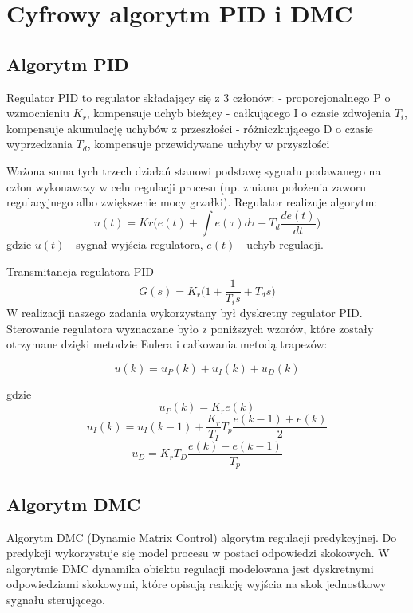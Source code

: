 \section{Cyfrowy algorytm PID i DMC}

\subsection{Algorytm PID}

Regulator PID to regulator składający się z 3 członów:\newline
\indent- proporcjonalnego P o wzmocnieniu $K_{r}$, kompensuje uchyb
bieżący\newline
\indent- całkującego I o czasie zdwojenia $T_{i}$, kompensuje akumulację
uchybów z przeszłości\newline
\indent- różniczkującego D o czasie wyprzedzania $T_{d}$, kompensuje
przewidywane uchyby w przyszłości\newline

Ważona suma tych trzech działań stanowi podstawę sygnału
podawanego na człon wykonawczy w celu regulacji procesu (np.
zmiana położenia zaworu regulacyjnego albo zwiększenie mocy
grzałki).
Regulator realizuje algorytm:
$$u(t) = Kr\Bigg(e(t)+\int e(\tau)d\tau+T_{d}\frac{de(t)}{dt}\Bigg)$$
gdzie $u(t)$ - sygnał wyjścia regulatora, $e(t)$ - uchyb regulacji.

Transmitancja regulatora PID
$$G(s) = K_{r}\Bigg( 1 +\frac{1}{T_{i}s}+T_{d}s\Bigg)$$
W realizacji naszego zadania wykorzystany był dyskretny regulator PID.
Sterowanie regulatora wyznaczane było z poniższych wzorów, które
zostały otrzymane dzięki metodzie Eulera i całkowania metodą
trapezów:

$$u(k)=u_{P}(k)+u_{I}(k)+u_{D}(k)$$

\indent gdzie
$$u_{P}(k)=K_{r}e(k)$$
$$u_{I}(k)=u_{I}(k-1)+\frac{K_{r}}{T_{I}}T_{p}\frac{e(k-1)+e(k)}{2}$$
$$u_{D}=K_{r}T_{D}\frac{e(k)-e(k-1)}{T_{p}}$$


\subsection{Algorytm DMC}

Algorytm DMC (Dynamic Matrix Control) algorytm regulacji predykcyjnej. 
Do predykcji wykorzystuje się model procesu w postaci odpowiedzi skokowych. 
W algorytmie DMC dynamika obiektu regulacji modelowana jest dyskretnymi odpowiedziami skokowymi, 
które opisują reakcję wyjścia na skok jednostkowy sygnału sterującego.
 
